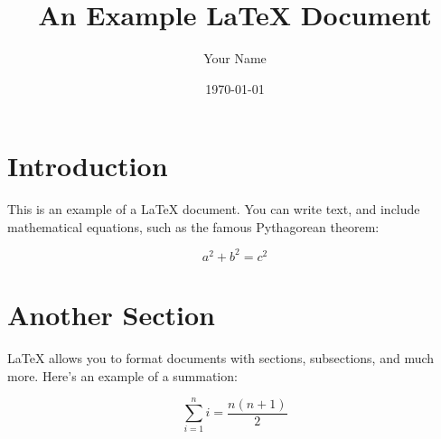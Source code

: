 \documentclass{article}
\begin{document}
\title{An Example LaTeX Document}
\author{Your Name}
\date{\today}
\maketitle

\section{Introduction}
This is an example of a LaTeX document. You can write text, and include mathematical equations, such as the famous Pythagorean theorem:

\begin{equation}
a^2 + b^2 = c^2
\end{equation}

\section{Another Section}
LaTeX allows you to format documents with sections, subsections, and much more. Here's an example of a summation:

\begin{equation}
\sum_{i=1}^{n} i = \frac{n(n+1)}{2}
\end{equation}
\end{document}
